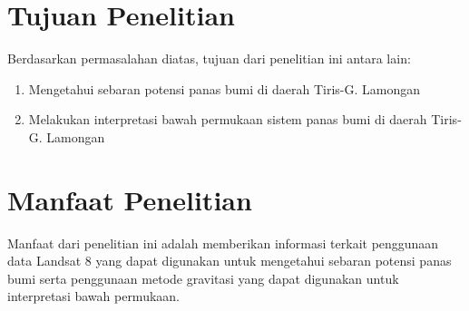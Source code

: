 \section{Tujuan Penelitian}
\hspace{22pt}Berdasarkan permasalahan diatas, tujuan dari penelitian ini antara lain:
\begin{enumerate}
    \item Mengetahui sebaran potensi panas bumi di daerah Tiris-G. Lamongan
    \item Melakukan interpretasi bawah permukaan sistem panas bumi di daerah Tiris-G. Lamongan
\end{enumerate}

\section{Manfaat Penelitian}
\hspace{22pt}Manfaat dari penelitian ini adalah memberikan informasi terkait penggunaan data Landsat 8 yang dapat digunakan untuk mengetahui sebaran potensi panas bumi serta penggunaan metode gravitasi yang dapat digunakan untuk interpretasi bawah permukaan.


